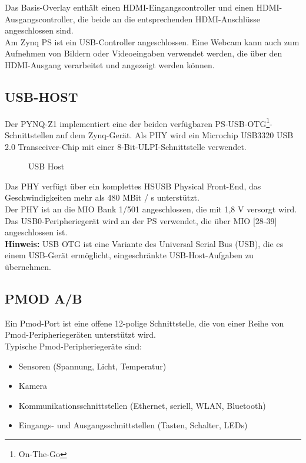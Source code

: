 \documentclass[a4paper]{report}
\begin{document}
Das Basis-Overlay enthält einen HDMI-Eingangscontroller und einen HDMI-Ausgangscontroller, die beide an die entsprechenden HDMI-Anschlüsse angeschlossen sind.\\
Am Zynq PS ist ein USB-Controller angeschlossen. Eine Webcam kann auch zum Aufnehmen von Bildern oder Videoeingaben verwendet werden, die über den HDMI-Ausgang verarbeitet und angezeigt werden können.


\subsection{USB-HOST}
Der PYNQ-Z1 implementiert eine der beiden verfügbaren PS-USB-OTG\footnote{On-The-Go}-Schnittstellen auf dem Zynq-Gerät.
Als PHY wird ein Microchip USB3320 USB 2.0 Transceiver-Chip mit einer 8-Bit-ULPI-Schnittstelle verwendet.

	\begin{figure}[H]
	\centering
	\caption{USB Host}
	\label{USB_Host}
	\end{figure}

Das PHY verfügt über ein komplettes HSUSB Physical Front-End, das Geschwindigkeiten mehr als 480 MBit / s unterstützt.\\
Der PHY ist an die MIO Bank 1/501 angeschlossen, die mit 1,8 V versorgt wird. Das USB0-Peripheriegerät wird an der PS verwendet, die über MIO [28-39] angeschlossen ist.\\
\textbf{Hinweis:} USB OTG ist eine Variante des Universal Serial Bus (USB), die es einem USB-Gerät ermöglicht, eingeschränkte USB-Host-Aufgaben zu übernehmen.


\subsection{PMOD A/B}
\label{PMODE_PORTS}

Ein Pmod-Port ist eine offene 12-polige Schnittstelle, die von einer Reihe von Pmod-Peripheriegeräten unterstützt wird.\\

Typische Pmod-Peripheriegeräte sind:
	
	\begin{itemize}
		\item Sensoren (Spannung, Licht, Temperatur)
		\item Kamera
		\item Kommunikationsschnittstellen (Ethernet, seriell, WLAN, Bluetooth) 
		\item Eingangs- und Ausgangsschnittstellen (Tasten, Schalter, LEDs)
	\end{itemize}
\end{document}
